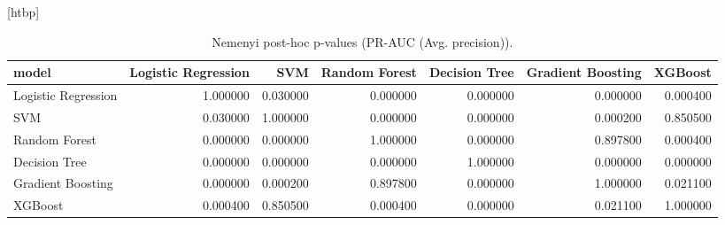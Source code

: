 \begin{table}
\small[htbp]
\caption{Nemenyi post-hoc p-values (PR-AUC (Avg. precision)).}
\label{tab:P04b_nemenyi_pr_auc}
\begin{tabular}{lrrrrrr}
\toprule
model & Logistic Regression & SVM & Random Forest & Decision Tree & Gradient Boosting & XGBoost \\
\midrule
Logistic Regression & 1.000000 & 0.030000 & 0.000000 & 0.000000 & 0.000000 & 0.000400 \\
SVM & 0.030000 & 1.000000 & 0.000000 & 0.000000 & 0.000200 & 0.850500 \\
Random Forest & 0.000000 & 0.000000 & 1.000000 & 0.000000 & 0.897800 & 0.000400 \\
Decision Tree & 0.000000 & 0.000000 & 0.000000 & 1.000000 & 0.000000 & 0.000000 \\
Gradient Boosting & 0.000000 & 0.000200 & 0.897800 & 0.000000 & 1.000000 & 0.021100 \\
XGBoost & 0.000400 & 0.850500 & 0.000400 & 0.000000 & 0.021100 & 1.000000 \\
\bottomrule
\end{tabular}
\end{table}
